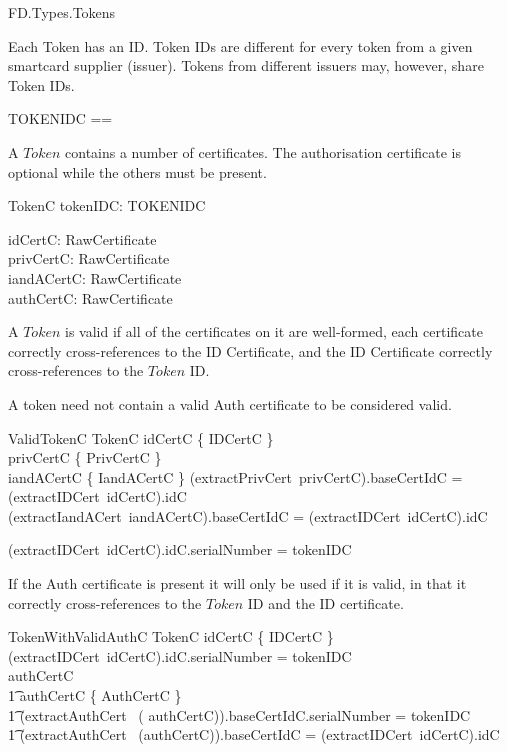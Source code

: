 \begin{traceunit}{FD.Types.Tokens}
\end{traceunit}

Each Token has an ID. Token IDs are different for every token from a
given smartcard supplier (issuer). Tokens from different issuers may,
however, share Token IDs. 
\begin{zed}
	 TOKENIDC == \nat
\end{zed}

A $Token$ contains a number of certificates. The
authorisation certificate is optional while the others must be present.
\begin{schema}{TokenC}
	tokenIDC: TOKENIDC

\also	idCertC: RawCertificate
\\	privCertC: RawCertificate
\\	iandACertC: RawCertificate
\\	authCertC: \Optional RawCertificate
\end{schema}


A $Token$ is valid if all of the certificates on it are well-formed,
each certificate correctly cross-references to the ID Certificate,
and the ID Certificate correctly cross-references to the $Token$ ID.

A token need not contain a valid Auth certificate to be considered valid.

\begin{schema}{ValidTokenC}
	TokenC
\where
        idCertC \in \{ IDCertC \}
\\      privCertC \in \{ PrivCertC \}
\\      iandACertC \in \{ IandACertC \}
\also
	(extractPrivCert~privCertC).baseCertIdC = (extractIDCert~idCertC).idC
\\	(extractIandACert~iandACertC).baseCertIdC = (extractIDCert~idCertC).idC

\also	
        (extractIDCert~idCertC).idC.serialNumber = tokenIDC

\end{schema}

If the Auth certificate is present it will only be used if it is
valid, in that it correctly cross-references to the $Token$ ID and the
ID certificate. 

\begin{schema}{TokenWithValidAuthC}
        TokenC
\where
        idCertC \in \{ IDCertC \}
\also
        (extractIDCert~idCertC).idC.serialNumber = tokenIDC
\also
\\      authCertC \neq \Nil 
\\      \t1     \land \The authCertC \in \{ AuthCertC \}
\\      \t1    \land  (extractAuthCert~ (\The
authCertC)).baseCertIdC.serialNumber = tokenIDC 
\\      \t1    \land (extractAuthCert~ (\The authCertC)).baseCertIdC = (extractIDCert~idCertC).idC

\end{schema}


